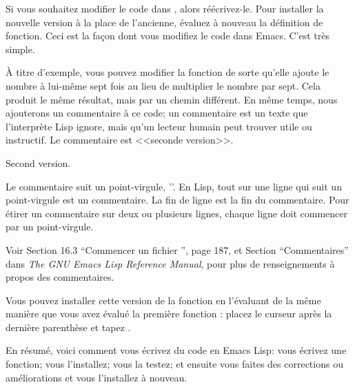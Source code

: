 Si vous souhaitez modifier le code dans , alors
réécrivez-le. Pour installer la nouvelle version à la place de
l'ancienne, évaluez à nouveau la définition de fonction. Ceci est la
façon dont vous modifiez le code dans Emacs. C'est très simple.

\`A titre d'exemple, vous pouvez modifier la fonction
 de sorte qu'elle ajoute le nombre à lui-même
sept fois au lieu de multiplier le nombre par sept. Cela produit le
même résultat, mais par un chemin différent. En même temps, nous
ajouterons un commentaire à ce code; un commentaire est un texte que
l'interprète Lisp ignore, mais qu'un lecteur humain peut trouver utile
ou instructif. Le commentaire est <<seconde version>>.

 Second version.



Le commentaire suit un point-virgule, '\tm{;}'. En Lisp, tout sur une
ligne qui suit un point-virgule est un commentaire. La fin de ligne
est la fin du commentaire. Pour étirer un commentaire sur deux ou
plusieurs lignes, chaque ligne doit commencer par un point-virgule.

Voir Section 16.3 ``Commencer un fichier '', page 187, et
Section ``Commentaires'' dans \textit{The GNU Emacs Lisp Reference
  Manual}, pour plus de renseignements à propos des commentaires.

Vous pouvez installer cette version de la fonction
 en l'évaluant de la même manière que vous avez
évalué la première fonction : placez le curseur après la dernière
parenthèse et tapez .

En résumé, voici comment vous écrivez du code en Emacs Lisp: vous
écrivez une fonction; vous l'installez; vous la testez; et ensuite
vous faites des corrections ou améliorations et vous l'installez à
nouveau. 